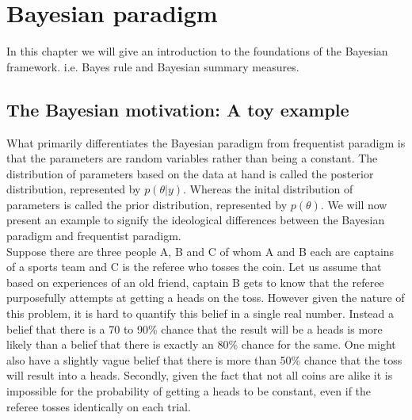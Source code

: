 
\chapter{Bayesian paradigm}
\label{ch : bayesian_paradigm}
In this chapter we will give an introduction to the foundations of the Bayesian framework. i.e. Bayes rule and Bayesian summary measures. 

\section{The Bayesian motivation: A toy example}
What primarily differentiates the Bayesian paradigm from frequentist paradigm is that the parameters are random variables rather than being a constant. The distribution of parameters based on the data at hand is called the posterior distribution, represented by $p(\theta|y)$. Whereas the inital distribution of parameters is called the prior distribution, represented by $p(\theta)$. We will now present an example to signify the ideological differences between the Bayesian paradigm and frequentist paradigm.\\

Suppose there are three people A, B and C of whom A and B each are captains of a sports team and C is the referee who tosses the coin. Let us assume that based on experiences of an old friend, captain B gets to know that the referee purposefully attempts at getting a heads on the toss. However given the nature of this problem, it is hard to quantify this belief in a single real number. Instead a belief that there is a 70 to 90\% chance that the result will be a heads is more likely than a belief that there is exactly an 80\% chance for the same. One might also have a slightly vague belief that there is more than 50\% chance that the toss will result into a heads. Secondly, given the fact that not all coins are alike it is impossible for the probability of getting a heads to be constant, even if the referee tosses identically on each trial.\\

